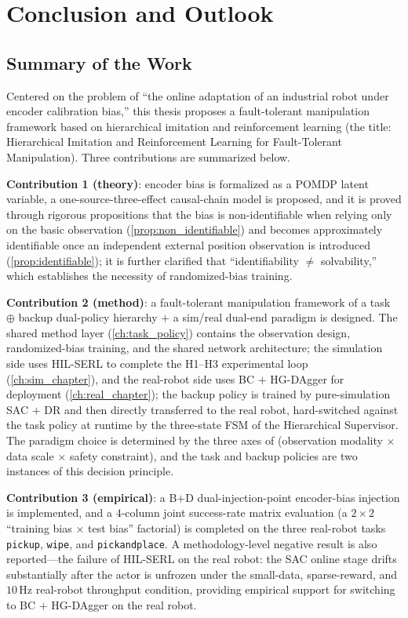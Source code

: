 
\chapter{Conclusion and Outlook}\label{ch:conclusion}

\section{Summary of the Work}\label{sec:summary}

Centered on the problem of ``the online adaptation of an industrial robot under encoder calibration bias,'' this thesis proposes a fault-tolerant manipulation framework based on hierarchical imitation and reinforcement learning (the title: Hierarchical Imitation and Reinforcement Learning for Fault-Tolerant Manipulation). Three contributions are summarized below.

\textbf{Contribution 1 (theory)}: encoder bias is formalized as a POMDP latent variable, a one-source-three-effect causal-chain model is proposed, and it is proved through rigorous propositions that the bias is non-identifiable when relying only on the basic observation (\cref{prop:non_identifiable}) and becomes approximately identifiable once an independent external position observation is introduced (\cref{prop:identifiable}); it is further clarified that ``identifiability $\neq$ solvability,'' which establishes the necessity of randomized-bias training.

\textbf{Contribution 2 (method)}: a fault-tolerant manipulation framework of a task $\oplus$ backup dual-policy hierarchy $+$ a sim/real dual-end paradigm is designed. The shared method layer (\cref{ch:task_policy}) contains the observation design, randomized-bias training, and the shared network architecture; the simulation side uses HIL-SERL to complete the H1--H3 experimental loop (\cref{ch:sim_chapter}), and the real-robot side uses BC $+$ HG-DAgger for deployment (\cref{ch:real_chapter}); the backup policy is trained by pure-simulation SAC $+$ DR and then directly transferred to the real robot, hard-switched against the task policy at runtime by the three-state FSM of the Hierarchical Supervisor. The paradigm choice is determined by the three axes of (observation modality $\times$ data scale $\times$ safety constraint), and the task and backup policies are two instances of this decision principle.

\textbf{Contribution 3 (empirical)}: a B$+$D dual-injection-point encoder-bias injection is implemented, and a $4$-column joint success-rate matrix evaluation (a $2\times2$ ``training bias $\times$ test bias'' factorial) is completed on the three real-robot tasks \texttt{pickup}, \texttt{wipe}, and \texttt{pickandplace}. A methodology-level negative result is also reported---the failure of HIL-SERL on the real robot: the SAC online stage drifts substantially after the actor is unfrozen under the small-data, sparse-reward, and $10$\,Hz real-robot throughput condition, providing empirical support for switching to BC $+$ HG-DAgger on the real robot.

